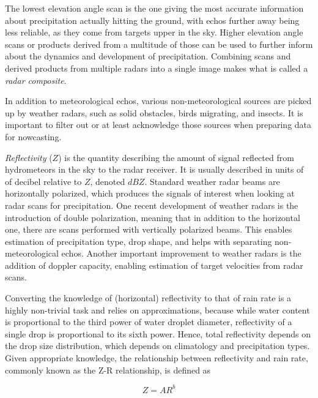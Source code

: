 The lowest elevation angle scan is the one giving the most accurate information about precipitation actually hitting the ground, with echos further away being less reliable, as they come from targets upper in the sky. Higher elevation angle scans or products derived from a multitude of those can be used to further inform about the dynamics and development of precipitation. Combining scans and derived products from multiple radars into a single image makes what is called a \textit{radar composite}.

In addition to meteorological echos, various non-meteorological sources are picked up by weather radars, such as solid obstacles, birds migrating, and insects. It is important to filter out or at least acknowledge those sources when preparing data for nowcasting. 


\textit{Reflectivity} ($Z$) is the quantity describing the amount of signal reflected from hydrometeors in the sky to the radar receiver. It is usually described in units of of decibel relative to $Z$, denoted $dBZ$. Standard weather radar beams are horizontally polarized, which produces the signals of interest when looking at radar scans for precipitation. One recent development of weather radars is the introduction of double polarization, meaning that in addition to the horizontal one, there are scans performed with vertically polarized beams. This enables estimation of precipitation type, drop shape, and helps with separating non-meteorological echos. Another important improvement to weather radars is the addition of doppler capacity, enabling estimation of target velocities from radar scans. 


Converting the knowledge of (horizontal) reflectivity to that of rain rate is a highly non-trivial task and relies on approximations, because while water content is proportional to the third power of water droplet diameter, reflectivity of a single drop is proportional to its sixth power. Hence, total reflectivity depends on the drop size distribution, which depends on climatology and precipitation types. Given appropriate knowledge, the relationship between reflectivity and rain rate, commonly known as the Z-R relationship, is defined as  

\begin{equation}
\label{eq:z-r}
	Z = AR^b
\end{equation}

